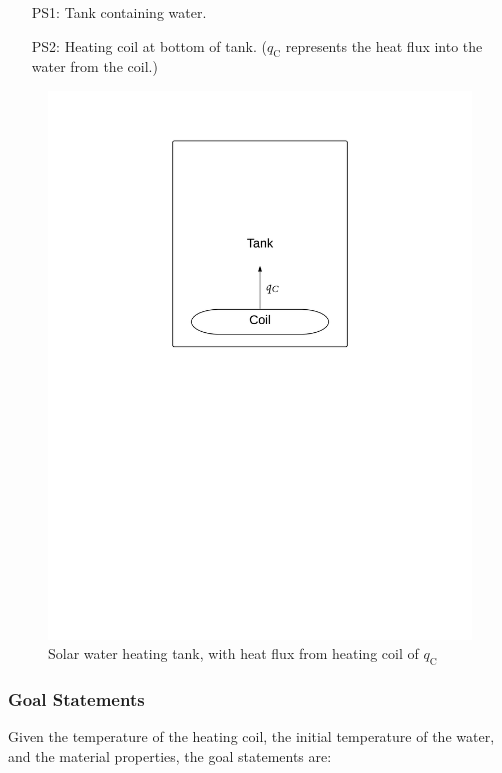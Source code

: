 \documentclass[12pt]{article}
\begin{document}
\begin{itemize}
\item[PS1:]{Tank containing water.}
\item[PS2:]{Heating coil at bottom of tank. (${q_{\text{C}}}$ represents the heat flux into the water from the coil.)}
\end{itemize}
\begin{figure}
\begin{center}
\includegraphics[width=\textwidth]{../../../../datafiles/nopcm/TankWaterOnly.png}
\caption{Solar water heating tank, with heat flux from heating coil of ${q_{\text{C}}}$}
\label{Figure:Tank}
\end{center}
\end{figure}
\subsubsection{Goal Statements}
\label{Sec:GoalStmt}
Given the temperature of the heating coil, the initial temperature of the water, and the material properties, the goal statements are:
\end{document}
